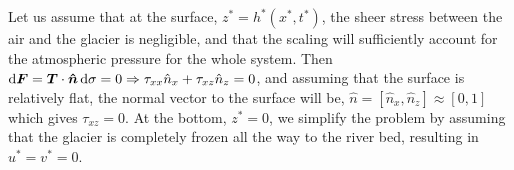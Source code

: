 Let us assume that at the surface, $z^* = h^*(x^*,t^*)$, the sheer stress between the air and the glacier is negligible, and that the scaling will sufficiently account for the atmospheric pressure for the whole system. Then $\dif{\boldsymbol{F}} = \boldsymbol{T} \cdot \boldsymbol{\hat{n}} \dif{\sigma} = 0 \Rightarrow \tau_{xx}\hat{n}_x + \tau_{xz}\hat{n}_z = 0 $, and assuming that the surface is relatively flat, the normal vector to the surface will be, $\hat{n} = [ \hat{n}_x, \hat{n}_z] \approx  [0,1]$ which gives $ \tau_{xz} = 0 $. At the bottom, $z^* = 0$, we simplify the problem by assuming that the glacier is completely frozen all the way to the river bed, resulting in $u^* = v^* = 0$. 